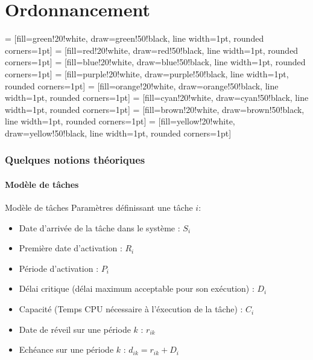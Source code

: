 \part{Ordonnancement}

  = [fill=green!20!white,  draw=green!50!black,  line width=1pt, rounded corners=1pt]
    = [fill=red!20!white,    draw=red!50!black,    line width=1pt, rounded corners=1pt]
   = [fill=blue!20!white,   draw=blue!50!black,   line width=1pt, rounded corners=1pt]
 = [fill=purple!20!white, draw=purple!50!black, line width=1pt, rounded corners=1pt]
 = [fill=orange!20!white, draw=orange!50!black, line width=1pt, rounded corners=1pt]
   = [fill=cyan!20!white,   draw=cyan!50!black,   line width=1pt, rounded corners=1pt]
  = [fill=brown!20!white,  draw=brown!50!black,  line width=1pt, rounded corners=1pt]
 = [fill=yellow!20!white, draw=yellow!50!black, line width=1pt, rounded corners=1pt]

\def\lo#1{ -- ++(#1,0) }
\def\hi#1{ |- ++(#1,1) -- ++(0,-1) }
\def\hop#1#2{\lo{#1}\hi{#2}}

\def\timeline#1#2#3{
  \draw[xstep=1,ystep=1.5,gray,very thin] (0,0) grid (#1.5,#2);
  \draw[->, line width=1pt] (0,#2) -- (#1.5,#2) coordinate (x axis);
  \draw[line width=1pt] (0,#2) -- (0,0) coordinate (x axis);
  \foreach \x in {0,1,...,#1}
    \draw (\x.5,#2) node[anchor=north] {\tiny\x};
  \foreach \y/\ytext in {#3}
    \draw (0,\y) node[anchor=east] {\ytext};
}

\section{Quelques notions théoriques}

\subsection{Modèle de tâches}

\begin{frame}{Modèle de tâches}
  Paramètres définissant une tâche $i$:
  \begin{itemize}
    \item Date d'arrivée de la tâche dans le système : $S_i$
    \item Première date d'activation : $R_i$
    \item Période d'activation : $P_i$
    \item Délai critique (délai maximum acceptable pour son exécution)
      : $D_i$
    \item Capacité (Temps CPU nécessaire à l'éxecution de la tâche) :
      $C_i$
    \item Date de réveil sur une période $k$ : $r_{ik}$
    \item Echéance sur une période $k$ : $d_{ik} = r_{ik} + D_i$
  \end{itemize}
\end{frame}

